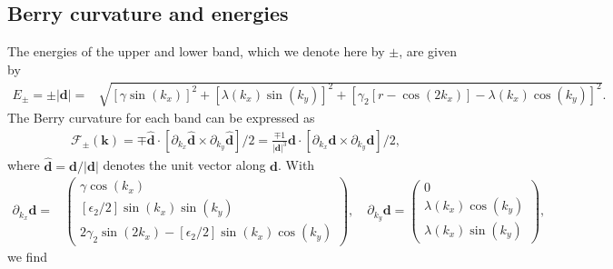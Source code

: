 \documentclass[aps,prb,amsmath,amssymb,twocolumn, superscriptaddress]{revtex4-2}
\begin{document}
\subsection{Berry curvature and energies}
The energies of the upper and lower band, which we denote here by $\pm$, are given by 
\begin{align}
E_\pm = \pm |\bm d| =& \sqrt{[\gamma \sin(k_x)]^2 + [\lambda(k_x) \sin(k_y)]^2 + [\gamma_2[r - \cos(2 k_x)] - \lambda(k_x) \cos(k_y)]^2}. \label{Eqn:Energy_analytically_App}
\end{align}
The Berry curvature for each band can be expressed as
\begin{align}
\mathcal F_{\pm}(\bm k) = \mp \bm {\hat  d} \cdot [\partial_{k_x} \bm {\hat  d} \times \partial_{k_y} \bm {\hat  d}]/ 2 = \frac{\mp 1}{|\bm d|^3}\bm {d} \cdot [\partial_{k_x} \bm {d} \times \partial_{k_y} \bm {d}]/ 2, \label{Eqn:Berry_curvature_analytically_App}
\end{align}
where $\bm {\hat  d} = \bm d / |\bm d|$ denotes the unit vector along $\bm d$. With
\begin{align}
\partial_{k_x} \bm d =& 
\begin{pmatrix}
\gamma \cos(k_x) \\
[\epsilon_2 / 2]\sin(k_x) \sin(k_y) \\
2 \gamma_2 \sin(2k_x) - [\epsilon_2 / 2]\sin(k_x) \cos(k_y) 
\end{pmatrix}, \quad 
\partial_{k_y} \bm d = 
\begin{pmatrix}
0 \\
\lambda(k_x)\cos(k_y) \\
\lambda(k_x) \sin(k_y)
\end{pmatrix},
\end{align}
we find 
\end{document}
